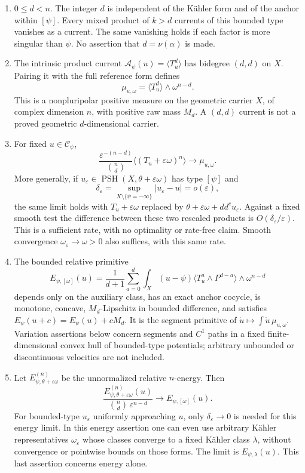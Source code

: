 \documentclass[
  10pt,
]{article}
\providecommand{\tightlist}{%
  \setlength{\itemsep}{0pt}\setlength{\parskip}{0pt}}
\begin{document}
\begin{enumerate}
\def\labelenumi{\arabic{enumi}.}
\tightlist
\item
  \(0\leq d<n\). The integer \(d\) is independent of the Kähler form and
  of the anchor within \([\psi]\). Every mixed product of \(k>d\)
  currents of this bounded type vanishes as a current. The same
  vanishing holds if each factor is more singular than \(\psi\). No
  assertion that \(d=\nu(\alpha)\) is made.
\item
  The intrinsic product current
  \(\mathcal{A}_\psi(u)=\langle T_u^d\rangle\) has bidegree \((d,d)\) on
  \(X\). Pairing it with the full reference form defines \[
  \mu_{u,\omega}=\langle T_u^d\rangle\wedge\omega^{n-d}.
  \] This is a nonpluripolar positive measure on the geometric carrier
  \(X\), of complex dimension \(n\), with positive raw mass \(M_d\). A
  \((d,d)\) current is not a proved geometric \(d\)-dimensional carrier.
\item
  For fixed \(u\in\mathcal{C}_\psi\), \[
  \frac{\varepsilon^{-(n-d)}}{\binom nd}\langle(T_u+\varepsilon\omega)^n\rangle\longrightarrow\mu_{u,\omega}.
  \] More generally, if
  \(u_\varepsilon\in\operatorname{PSH}(X,\theta+\varepsilon\omega)\) has
  type \([\psi]\) and \[
  \delta_\varepsilon=\sup_{X\setminus\{\psi=-\infty\}}|u_\varepsilon-u|=o(\varepsilon),
  \] the same limit holds with \(T_u+\varepsilon\omega\) replaced by
  \(\theta+\varepsilon\omega+dd^cu_\varepsilon\). Against a fixed smooth
  test the difference between these two rescaled products is
  \(O(\delta_\varepsilon/\varepsilon)\). This is a sufficient rate, with
  no optimality or rate-free claim. Smooth convergence
  \(\omega_\varepsilon\to\omega>0\) also suffices, with this same rate.
\item
  The bounded relative primitive \[
  E_{\psi,[\omega]}(u)=\frac1{d+1}\sum_{a=0}^d\int_X(u-\psi)\langle T_u^a\wedge P^{d-a}\rangle\wedge\omega^{n-d}
  \] depends only on the auxiliary class, has an exact anchor cocycle,
  is monotone, concave, \(M_d\)-Lipschitz in bounded difference, and
  satisfies \(E_\psi(u+c)=E_\psi(u)+cM_d\). It is the segment primitive
  of \(\dot u\mapsto\int\dot u\,\mu_{u,\omega}\). Variation assertions
  below concern segments and \(C^1\) paths in a fixed finite-dimensional
  convex hull of bounded-type potentials; arbitrary unbounded or
  discontinuous velocities are not included.
\item
  Let \(E^{(n)}_{\psi,\theta+\varepsilon\omega}\) be the unnormalized
  relative \(n\)-energy. Then \[
  \frac{E^{(n)}_{\psi,\theta+\varepsilon\omega}(u)}{\binom nd\,\varepsilon^{n-d}}\longrightarrow E_{\psi,[\omega]}(u).
  \] For bounded-type \(u_\varepsilon\) uniformly approaching \(u\),
  only \(\delta_\varepsilon\to0\) is needed for this energy limit. In
  this energy assertion one can even use arbitrary Kähler
  representatives \(\omega_\varepsilon\) whose classes converge to a
  fixed Kähler class \(\lambda\), without convergence or pointwise
  bounds on those forms. The limit is \(E_{\psi,\lambda}(u)\). This last
  assertion concerns energy alone.
\end{enumerate}
\end{document}
